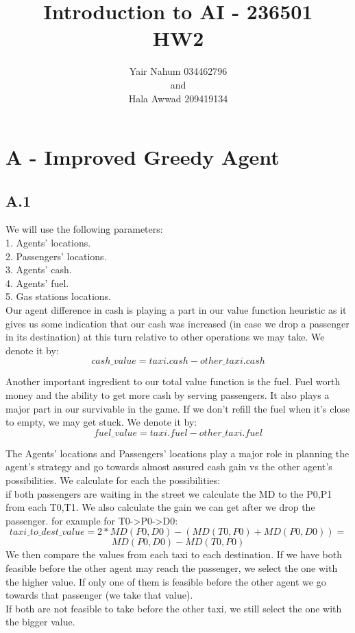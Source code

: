 \documentclass[12pt]{article}
\title{Introduction to AI - 236501\\HW2}
\author{Yair Nahum 034462796\\and\\Hala Awwad 209419134 }
\begin{document}
\maketitle


\section*{A - Improved Greedy Agent}

\subsection*{A.1}

We will use the following parameters:\\
1. Agents' locations.\\
2. Passengers' locations.\\
3. Agents' cash.\\
4. Agents' fuel.\\
5. Gas stations locations.\\

Our agent difference in cash is playing a part in our value function heuristic as it gives us some indication
that our cash was increased (in case we drop a passenger in its destination) at this turn relative to
other operations we may take. We denote it by:
$$cash\_value = taxi.cash - other\_taxi.cash$$

Another important ingredient to our total value function is the fuel. Fuel worth money and the ability to get
more cash by serving passengers. It also plays a major part in our survivable in the game. If we don't refill
the fuel when it's close to empty, we may get stuck. We denote it by:
$$fuel\_value = taxi.fuel - other\_taxi.fuel$$

The Agents' locations and Passengers' locations play a major role in planning the agent's strategy and go towards almost assured cash gain vs the other agent's possibilities.
We calculate for each the possibilities:\\

if both passengers are waiting in the street we calculate the MD to the P0,P1 from each T0,T1. We also calculate the gain we can get after we drop the passenger. for example for T0->P0->D0:
$$taxi\_to\_dest\_value = 2 * MD(P0,D0)- (MD(T0,P0) + MD(P0,D0)) =$$
$$ MD(P0,D0)- MD(T0,P0)$$
We then compare the values from each taxi to each destination.
If we have both feasible before the other agent may reach the passenger, we select the one with the higher value. If only one of them is feasible before the other agent we go towards that passenger (we take that value).\\
If both are not feasible to take before the other taxi, we still select the one with the bigger value.\\
\end{document}
